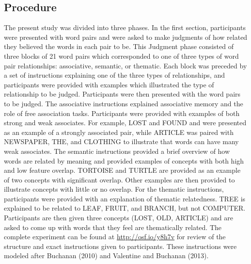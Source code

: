 \documentclass[english,man]{apa6}
\theoremstyle{definition}
\theoremstyle{definition}
\theoremstyle{definition}
\theoremstyle{remark}
\begin{document}
\subsection{Procedure}\label{procedure}

The present study was divided into three phases. In the first section,
participants were presented with word pairs and were asked to make
judgments of how related they believed the words in each pair to be.
This Judgment phase consisted of three blocks of 21 word pairs which
corresponded to one of three types of word pair relationships:
associative, semantic, or thematic. Each block was preceded by a set of
instructions explaining one of the three types of relationships, and
participants were provided with examples which illustrated the type of
relationship to be judged. Participants were then presented with the
word pairs to be judged. The associative instructions explained
associative memory and the role of free association tasks. Participants
were provided with examples of both strong and weak associates. For
example, LOST and FOUND and were presented as an example of a strongly
associated pair, while ARTICLE was paired with NEWSPAPER, THE, and
CLOTHING to illustrate that words can have many weak associates. The
semantic instructions provided a brief overview of how words are related
by meaning and provided examples of concepts with both high and low
feature overlap. TORTOISE and TURTLE are provided as an example of two
concepts with significant overlap. Other examples are then provided to
illustrate concepts with little or no overlap. For the thematic
instructions, participants were provided with an explanation of thematic
relatedness. TREE is explained to be related to LEAF, FRUIT, and BRANCH,
but not COMPUTER. Participants are then given three concepts (LOST, OLD,
ARTICLE) and are asked to come up with words that they feel are
thematically related. The complete experiment can be found at
\url{http://osf.io/y8h7v} for review of the structure and exact
instructions given to participants. These instructions were modeled
after Buchanan (2010) and Valentine and Buchanan (2013).
\end{document}
